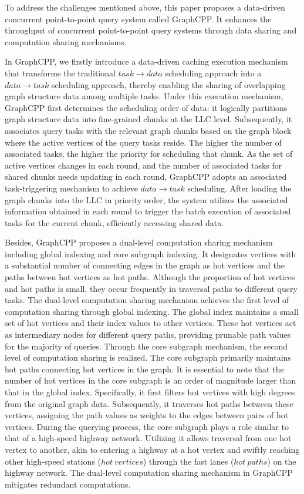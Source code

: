 \documentclass[lettersize,journal]{IEEEtran} %
\begin{document}
To address the challenges mentioned above, this paper proposes a data-driven concurrent point-to-point query system called GraphCPP. It enhances the throughput of concurrent point-to-point query systems through data sharing and computation sharing mechanisms.

In GraphCPP, we firstly introduce a data-driven caching execution mechanism that transforms the traditional $task \rightarrow data$ scheduling approach into a $data \rightarrow task$ scheduling approach, thereby enabling the sharing of overlapping graph structure data among multiple tasks. Under this execution mechanism, GraphCPP first determines the scheduling order of data: it logically partitions graph structure data into fine-grained chunks at the LLC level. Subsequently, it associates query tasks with the relevant graph chunks based on the graph block where the active vertices of the query tasks reside. The higher the number of associated tasks, the higher the priority for scheduling that chunk. As the set of active vertices changes in each round, and the number of associated tasks for shared chunks needs updating in each round, GraphCPP adopts an associated task-triggering mechanism to achieve $data \rightarrow task$ scheduling. After loading the graph chunks into the LLC in priority order, the system utilizes the associated information obtained in each round to trigger the batch execution of associated tasks for the current chunk, efficiently accessing shared data.

Besides, GraphCPP proposes a dual-level computation sharing mechanism including global indexing and core subgraph indexing. It designates vertices with a substantial number of connecting edges in the graph as hot vertices and the paths between hot vertices as hot paths. Although the proportion of hot vertices and hot paths is small, they occur frequently in traversal paths to different query tasks. The dual-level computation sharing mechanism achieves the first level of computation sharing through global indexing. The global index maintains a small set of hot vertices and their index values to other vertices. These hot vertices act as intermediary nodes for different query paths, providing prunable path values for the majority of queries. Through the core subgraph mechanism, the second level of computation sharing is realized. The core subgraph primarily maintains hot paths connecting hot vertices in the graph. It is essential to note that the number of hot vertices in the core subgraph is an order of magnitude larger than that in the global index. Specifically, it first filters hot vertices with high degrees from the original graph data. Subsequently, it traverses hot paths between these vertices, assigning the path values as weights to the edges between pairs of hot vertices. During the querying process, the core subgraph plays a role similar to that of a high-speed highway network. Utilizing it allows traversal from one hot vertex to another, akin to entering a highway at a hot vertex and swiftly reaching other high-speed stations ($hot~vertices$) through the fast lanes ($hot~paths$) on the highway network. The dual-level computation sharing mechanism in GraphCPP mitigates redundant computations.
\end{document}
